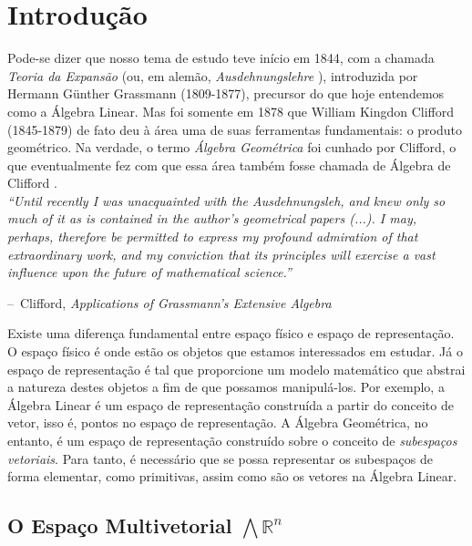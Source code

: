 \documentclass[11pt]{article}
\makeatletter
\newenvironment{chapquote}[2][2em]
{\setlength{\@tempdima}{#1}%
	\def\chapquote@author{#2}%
	\parshape 1 \@tempdima \dimexpr\textwidth-2\@tempdima\relax%
	\itshape}
{\par\normalfont\hfill--\ \chapquote@author\hspace*{\@tempdima}\par\bigskip}
\makeatother
\begin{document}
\tableofcontents

\section{Introdução}

Pode-se dizer que nosso tema de estudo teve início em 1844, com a chamada \textit{Teoria da Expansão} (ou, em alemão, \textit{Ausdehnungslehre} \cite{grassmannLineale}), introduzida por Hermann Günther Grassmann (1809-1877), precursor do que hoje entendemos como a Álgebra Linear. Mas foi somente em 1878 que William Kingdon Clifford (1845-1879) de fato deu à área uma de suas ferramentas fundamentais: o produto geométrico. Na verdade, o termo \textit{Álgebra Geométrica} foi cunhado por Clifford, o que eventualmente fez com que essa área também fosse chamada de Álgebra de Clifford \cite{sommerGeometric}. 
\\


\begin{chapquote}{Clifford, \textit{Applications of Grassmann's Extensive Algebra} \cite{cliffordApplicationsGrassmannAlgebras}}
	``Until recently I was unacquainted with the Ausdehnungsleh, and knew only so much of it as is contained in the author's geometrical papers (...). I may, perhaps, therefore be permitted to express my profound admiration of that extraordinary work, and my conviction that its principles will exercise a vast influence upon the future of mathematical science.''
\end{chapquote}


Existe uma diferença fundamental entre espaço físico e espaço de representação. O espaço físico é onde estão os objetos que estamos interessados em estudar. Já o espaço de representação é tal que proporcione um modelo matemático que abstrai a natureza destes objetos a fim de que possamos manipulá-los. Por exemplo, a Álgebra Linear é um espaço de representação construída a partir do conceito de vetor, isso é, pontos no espaço de representação. A Álgebra Geométrica, no entanto, é um espaço de representação construído sobre o conceito de \textit{subespaços vetoriais}. Para tanto, é necessário que se possa representar os subespaços de forma elementar, como primitivas, assim como são os vetores na Álgebra Linear.

\subsection{O Espaço Multivetorial $\bigwedge\mathbb{R}^n$}
\end{document}
